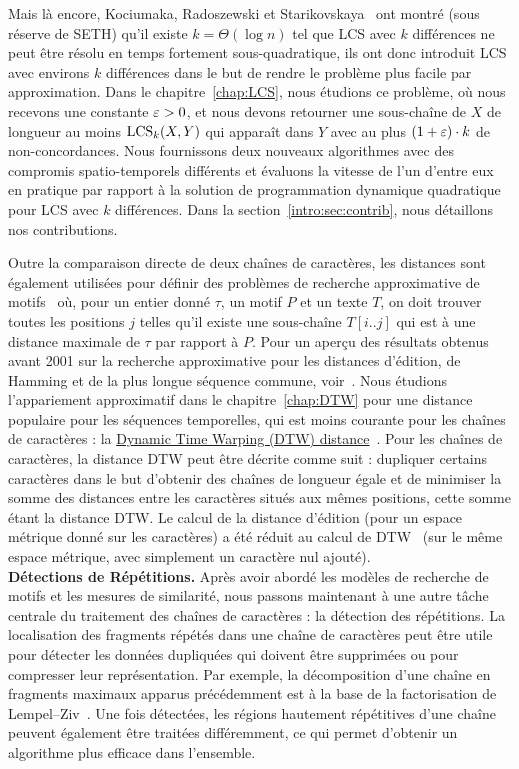 Mais là encore, Kociumaka, Radoszewski et Starikovskaya~\cite{DBLP:journals/algorithmica/KociumakaRS19} ont montré (sous réserve de SETH) qu'il existe $k=\Theta(\log n)$ tel que LCS avec $k$ différences ne peut être résolu en temps fortement sous-quadratique, ils ont donc introduit LCS avec environs $k$ différences dans le but de rendre le problème plus facile par approximation.
Dans le chapitre~\ref{chap:LCS}, nous étudions ce problème, où nous recevons une constante $\varepsilon > 0$, et nous devons retourner une sous-chaîne de $X$ de longueur au moins $\mathrm{LCS}_{k}(X,Y)$ qui apparaît dans $Y$ avec au plus $(1+\varepsilon) \cdot k$ de non-concordances. Nous fournissons deux nouveaux algorithmes avec des compromis spatio-temporels différents et évaluons la vitesse de l'un d'entre eux en pratique par rapport à la solution de programmation dynamique quadratique pour LCS avec $k$ différences. Dans la section~\ref{intro:sec:contrib}, nous détaillons nos contributions.

Outre la comparaison directe de deux chaînes de caractères, les distances sont également utilisées pour définir des problèmes de recherche approximative de motifs~\cite{landau1986efficient,landau1989fast} où, pour un entier donné $\tau$, un motif $P$ et un texte $T$, on doit trouver toutes les positions $j$ telles qu'il existe une sous-chaîne $T[i..j]$ qui est à une distance maximale de $\tau$ par rapport à $P$.
Pour un aperçu des résultats obtenus avant 2001 sur la recherche approximative pour les distances d'édition, de Hamming et de la plus longue séquence commune, voir~\cite{navarro2001guided}.
Nous étudions l'appariement approximatif dans le chapitre~\ref{chap:DTW} pour une distance populaire pour les séquences temporelles, qui est moins courante pour les chaînes de caractères : la \underline{Dynamic Time Warping (DTW) distance}~\cite{sakoe1978dynamic}. Pour les chaînes de caractères, la distance DTW peut être décrite comme suit : dupliquer certains caractères dans le but d'obtenir des chaînes de longueur égale et de minimiser la somme des distances entre les caractères situés aux mêmes positions, cette somme étant la distance DTW. Le calcul de la distance d'édition (pour un espace métrique donné sur les caractères) a été réduit au calcul de DTW~\cite{DBLP:conf/icalp/Kuszmaul19} (sur le même espace métrique, avec simplement un caractère nul ajouté).\\


\noindent\textbf{Détections de Répétitions.} Après avoir abordé les modèles de recherche de motifs et les mesures de similarité, nous passons maintenant à une autre tâche centrale du traitement des chaînes de caractères : la détection des répétitions. La localisation des fragments répétés dans une chaîne de caractères peut être utile pour détecter les données dupliquées qui doivent être supprimées ou pour compresser leur représentation. Par exemple, la décomposition d'une chaîne en fragments maximaux apparus précédemment est à la base de la factorisation de Lempel--Ziv~\cite{ziv1977universal}. Une fois détectées, les régions hautement répétitives d'une chaîne peuvent également être traitées différemment, ce qui permet d'obtenir un algorithme plus efficace dans l'ensemble.

